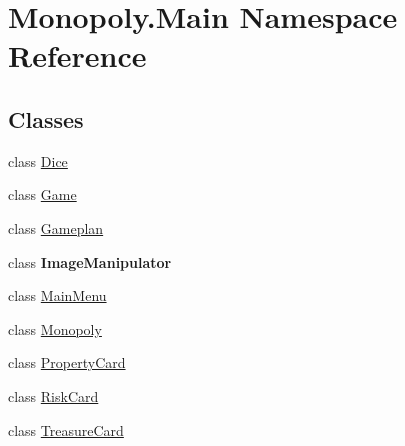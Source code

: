 \hypertarget{namespace_monopoly_1_1_main}{}\section{Monopoly.\+Main Namespace Reference}
\label{namespace_monopoly_1_1_main}
\subsection*{Classes}
\begin{DoxyCompactItemize}
\item 
class \mbox{\hyperlink{class_monopoly_1_1_main_1_1_dice}{Dice}}
\item 
class \mbox{\hyperlink{class_monopoly_1_1_main_1_1_game}{Game}}
\item 
class \mbox{\hyperlink{class_monopoly_1_1_main_1_1_gameplan}{Gameplan}}
\item 
class {\bfseries Image\+Manipulator}
\item 
class \mbox{\hyperlink{class_monopoly_1_1_main_1_1_main_menu}{Main\+Menu}}
\item 
class \mbox{\hyperlink{class_monopoly_1_1_main_1_1_monopoly}{Monopoly}}
\item 
class \mbox{\hyperlink{class_monopoly_1_1_main_1_1_property_card}{Property\+Card}}
\item 
class \mbox{\hyperlink{class_monopoly_1_1_main_1_1_risk_card}{Risk\+Card}}
\item 
class \mbox{\hyperlink{class_monopoly_1_1_main_1_1_treasure_card}{Treasure\+Card}}
\end{DoxyCompactItemize}
